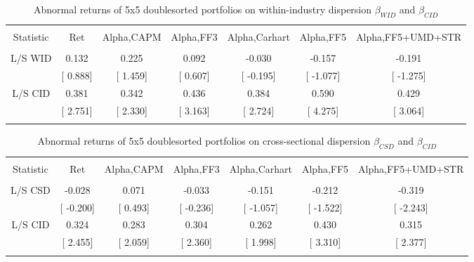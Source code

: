 \documentclass[16pt]{article}
\begin{document}
\begin{table}[!htbp] \centering 
  \caption{Abnormal returns of 5x5 doublesorted portfolios on within-industry dispersion $\beta_{WID}$ and $\beta_{CID}$} 
  \label{} 
\begin{tabular}{@{\extracolsep{5pt}} ccccccc} 
\\[-1.8ex]\hline 
\hline \\[-1.8ex] 
Statistic & Ret & Alpha,CAPM & Alpha,FF3 & Alpha,Carhart & Alpha,FF5 & Alpha,FF5+UMD+STR \\ 
\hline \\[-1.8ex] 
L/S WID & 0.132 & 0.225 & 0.092 & -0.030 & -0.157 & -0.191 \\ 
& [ 0.888] & [ 1.459] & [ 0.607] & [ -0.195] & [ -1.077] & [ -1.275] \\ 
L/S CID & 0.381 & 0.342 & 0.436 & 0.384 & 0.590 & 0.429 \\ 
& [ 2.751] & [ 2.330] & [ 3.163] & [ 2.724] & [ 4.275] & [ 3.064] \\ 
\hline \\[-1.8ex] 
\end{tabular} 
\end{table}



\begin{table}[!htbp] \centering 
  \caption{Abnormal returns of 5x5 doublesorted portfolios on cross-sectional dispersion $\beta_{CSD}$ and $\beta_{CID}$} 
  \label{} 
\begin{tabular}{@{\extracolsep{5pt}} ccccccc} 
\\[-1.8ex]\hline 
\hline \\[-1.8ex] 
Statistic & Ret & Alpha,CAPM & Alpha,FF3 & Alpha,Carhart & Alpha,FF5 & Alpha,FF5+UMD+STR \\ 
\hline \\[-1.8ex] 
L/S CSD & -0.028 & 0.071 & -0.033 & -0.151 & -0.212 & -0.319 \\ 
& [ -0.200] & [ 0.493] & [ -0.236] & [ -1.057] & [ -1.522] & [ -2.243] \\ 
L/S CID & 0.324 & 0.283 & 0.304 & 0.262 & 0.430 & 0.315 \\ 
& [ 2.455] & [ 2.059] & [ 2.360] & [ 1.998] & [ 3.310] & [ 2.377] \\ 
\hline \\[-1.8ex] 
\end{tabular} 
\end{table}
\end{document}
